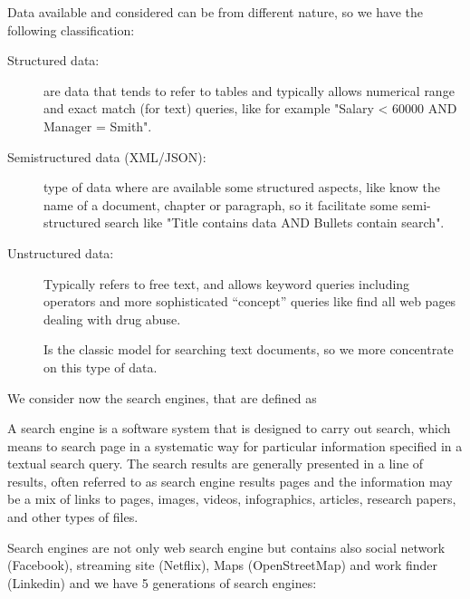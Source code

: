 Data available and considered can be from different nature, so we have the following classification:
\begin{description}
    \item [Structured data: ] are data that tends to refer to tables and typically allows numerical range
                              and exact match (for text) queries, like for example "Salary < 60000 AND Manager = Smith".
    \item [Semistructured data (XML/JSON): ] type of data where are available some structured aspects, like know
                                             the name of a document, chapter or paragraph, so it facilitate some
                                             semi-structured search like 
                                             "Title contains data AND Bullets contain search".

    \item [Unstructured data: ] Typically refers to free text, and allows keyword queries including operators and
                                more sophisticated “concept” queries like find all web pages dealing with drug abuse.

                                Is the classic model for searching text documents, so we more concentrate on this
                                type of data.
\end{description}
We consider now the search engines, that are defined as 
\begin{defi}
A search engine is a software system that is designed to carry out search, which means to search page 
in a systematic way for particular information specified in a textual search query.\newline
The search results are generally presented in a line of results, often referred to as search engine results pages 
and the information may be a mix of links to pages, images, videos, infographics, articles, research papers,
and other types of files.
\end{defi}
Search engines are not only web search engine but contains also social network (Facebook), streaming site (Netflix),
Maps (OpenStreetMap) and work finder (Linkedin) and we have 5 generations of search engines:
